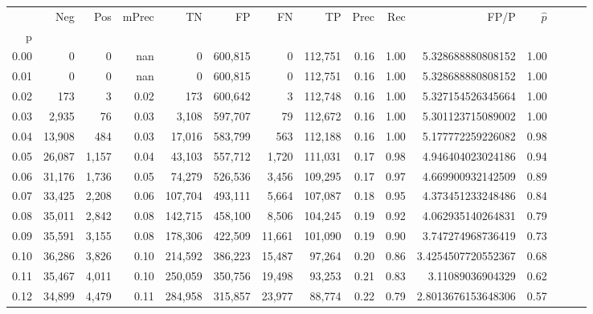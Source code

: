 \begin{tabular}{rrrrrrrrrrrrrrr}
\toprule
{} &     Neg &    Pos & mPrec &       TN &       FP &       FN &       TP &  Prec &   Rec &                    FP/P & $\hat{p}$ \\
p    &         &        &       &          &          &          &          &       &       &                         &           \\
\midrule
0.00 &       0 &      0 &   nan &        0 &  600,815 &        0 &  112,751 &  0.16 &  1.00 &       5.328688880808152 &      1.00 \\
0.01 &       0 &      0 &   nan &        0 &  600,815 &        0 &  112,751 &  0.16 &  1.00 &       5.328688880808152 &      1.00 \\
0.02 &     173 &      3 &  0.02 &      173 &  600,642 &        3 &  112,748 &  0.16 &  1.00 &       5.327154526345664 &      1.00 \\
0.03 &   2,935 &     76 &  0.03 &    3,108 &  597,707 &       79 &  112,672 &  0.16 &  1.00 &       5.301123715089002 &      1.00 \\
0.04 &  13,908 &    484 &  0.03 &   17,016 &  583,799 &      563 &  112,188 &  0.16 &  1.00 &       5.177772259226082 &      0.98 \\
0.05 &  26,087 &  1,157 &  0.04 &   43,103 &  557,712 &    1,720 &  111,031 &  0.17 &  0.98 &       4.946404023024186 &      0.94 \\
0.06 &  31,176 &  1,736 &  0.05 &   74,279 &  526,536 &    3,456 &  109,295 &  0.17 &  0.97 &       4.669900932142509 &      0.89 \\
0.07 &  33,425 &  2,208 &  0.06 &  107,704 &  493,111 &    5,664 &  107,087 &  0.18 &  0.95 &       4.373451233248486 &      0.84 \\
0.08 &  35,011 &  2,842 &  0.08 &  142,715 &  458,100 &    8,506 &  104,245 &  0.19 &  0.92 &       4.062935140264831 &      0.79 \\
0.09 &  35,591 &  3,155 &  0.08 &  178,306 &  422,509 &   11,661 &  101,090 &  0.19 &  0.90 &       3.747274968736419 &      0.73 \\
0.10 &  36,286 &  3,826 &  0.10 &  214,592 &  386,223 &   15,487 &   97,264 &  0.20 &  0.86 &      3.4254507720552367 &      0.68 \\
0.11 &  35,467 &  4,011 &  0.10 &  250,059 &  350,756 &   19,498 &   93,253 &  0.21 &  0.83 &        3.11089036904329 &      0.62 \\
0.12 &  34,899 &  4,479 &  0.11 &  284,958 &  315,857 &   23,977 &   88,774 &  0.22 &  0.79 &      2.8013676153648306 &      0.57 \\

\end{tabular}
